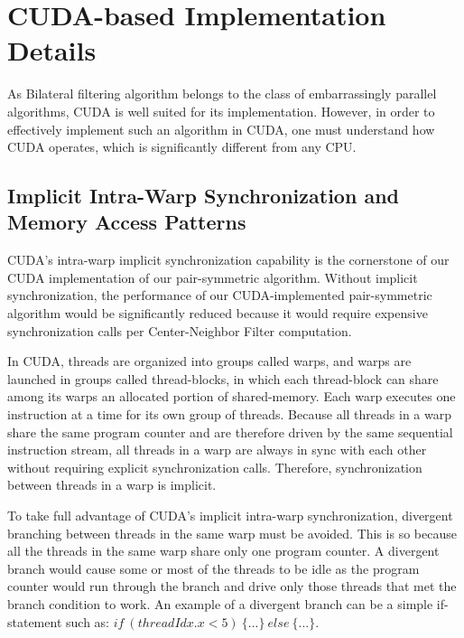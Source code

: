 \documentclass{IEEEtran}
\begin{document}
\section{CUDA-based Implementation Details}
\label{sec:GPUoptimizations} 
As Bilateral filtering algorithm belongs to the class of embarrassingly parallel algorithms, CUDA is well suited for its implementation. However,
in order to effectively implement such an algorithm in CUDA, one must understand how CUDA operates, which is significantly different from any CPU.

\subsection{Implicit Intra-Warp Synchronization and Memory Access Patterns}

CUDA's intra-warp implicit synchronization capability is the cornerstone of our CUDA implementation of our pair-symmetric algorithm. Without implicit synchronization, the performance of our CUDA-implemented pair-symmetric algorithm would be significantly reduced because it would require expensive synchronization calls per Center-Neighbor Filter computation.

In CUDA, threads are organized into groups called warps, and warps are launched in groups called thread-blocks, in which each thread-block can share among its warps an allocated portion of shared-memory. Each warp executes one instruction at a time for its own group of threads. Because all threads in a warp share the same program counter and are therefore driven by the same sequential instruction stream, all threads in a warp are always in sync with each other without requiring explicit synchronization calls. Therefore, synchronization between threads in a warp is implicit.

To take full advantage of CUDA's implicit intra-warp synchronization, divergent branching between threads in the same warp must be avoided. This is so because all the threads in the same warp share only one program counter. A divergent branch would cause some or most of the threads to be idle as the program counter would run through the branch and drive only those threads that met the branch condition to work. An example of a divergent branch can be a simple if-statement such as: $if~(threadIdx.x < 5)~\{...\}~else~\{...\}$.
\end{document}

